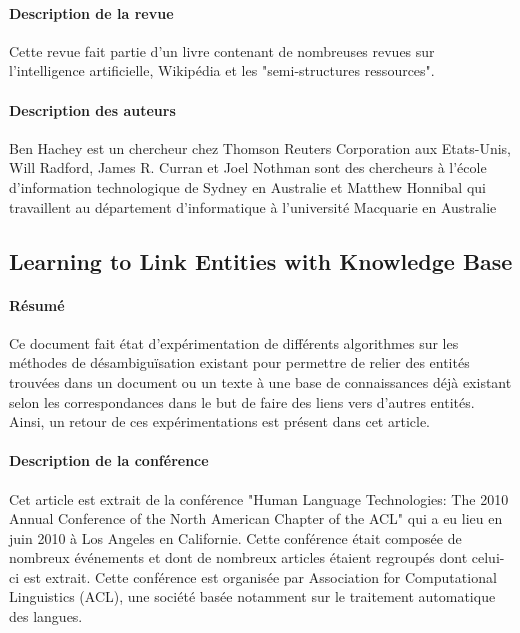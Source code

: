 \documentclass{article}
\begin{document}
\paragraph{Description de la revue}
Cette revue fait partie d'un livre contenant de nombreuses revues sur l'intelligence artificielle, Wikipédia et les "semi-structures ressources".

\paragraph{Description des auteurs}
Ben Hachey est un chercheur chez Thomson Reuters Corporation aux Etats-Unis, Will Radford, James R. Curran et Joel Nothman sont des chercheurs à l'école d'information technologique de Sydney en Australie et Matthew Honnibal qui travaillent au département d'informatique à l'université Macquarie en Australie

\subsection{Learning to Link Entities with Knowledge Base\cite{article-4}}

\paragraph{Résumé}
Ce document fait état d'expérimentation de différents algorithmes sur les  méthodes de désambiguïsation existant pour permettre de relier des entités trouvées dans un document ou un texte à une base de connaissances déjà existant selon les correspondances dans le but de faire des liens vers d'autres entités. Ainsi, un retour de ces expérimentations est présent dans cet article.

\paragraph{Description de la conférence}
Cet article est extrait de la conférence "Human Language Technologies: The 2010 Annual Conference of the North American Chapter of the ACL" qui a eu lieu en juin 2010 à Los Angeles en Californie. Cette conférence était composée de nombreux événements et dont de nombreux articles étaient regroupés dont celui-ci est extrait. Cette conférence est organisée par Association for Computational Linguistics (ACL), une société basée notamment sur le traitement automatique des langues.
\end{document}
